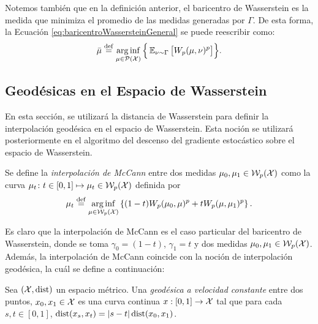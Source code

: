 {{{			\begin{remark}
				Notemos también que en la definición anterior, el baricentro de Wasserstein es la medida que minimiza el promedio de las medidas generadas por $\Gamma$. De esta forma, la Ecuación \eqref{eq:baricentroWassersteinGeneral} se puede reescribir como:
				\begin{equation}
					\bar \mu \eqdef \arginf_{\mu \in \ProbSpace} \Big\{ \Exp_{\nu \sim \Gamma} \big[ \Wasserstein[p]{\mu}{\nu}^p \big] \Big\}.
				\end{equation}

			\end{remark}




		}  %


		\subsection*{Geodésicas en el Espacio de Wasserstein}\label{ssec:geodesicas-Wasserstein}
		{
			En esta sección, se utilizará la distancia de Wasserstein para definir la interpolación geodésica en el espacio de Wasserstein. Esta noción se utilizará posteriormente en el algoritmo del descenso del gradiente estocástico sobre el espacio de Wasserstein.

			\begin{definition}
				Se define la \emph{interpolación de McCann} entre dos medidas $\mu_0, \mu_1 \in \WassersteinSpace[p]{\cX} $ como la curva $\mu_t \colon t \in [0, 1] \mapsto \mu_t \in \WassersteinSpace[p]{\cX} $ definida por
				\begin{equation}
					\mu_t \eqdef \arginf_{\mu \in \WassersteinSpace[p]{\cX} } \left\{ (1-t) \Wasserstein[p]{\mu_0}{\mu}^p + t \Wasserstein[p]{\mu}{\mu_1}^p \right\}.
				\end{equation}
			\end{definition}

			Es claro que la interpolación de McCann es el caso particular del baricentro de Wasserstein, donde se toma $\gamma_0 = (1-t)$, $\gamma_1 = t$ y dos medidas $\mu_0, \mu_1 \in \WassersteinSpace[p]{\cX} $. Además, la interpolación de McCann coincide con la noción de interpolación geodésica, la cuál se define a continuación:

			\begin{definition}
				Sea $(\cX, \dist)$ un espacio métrico. Una \emph{geodésica a velocidad constante}  entre dos puntos, $x_0, x_1 \in \cX$ es una curva continua $x : [0, 1] \to \cX$  tal que para cada $s, t \in [0, 1]$, $\dist(x_s,x_t) = |s - t| \dist(x_0,x_1) $.
			\end{definition}

}}}
